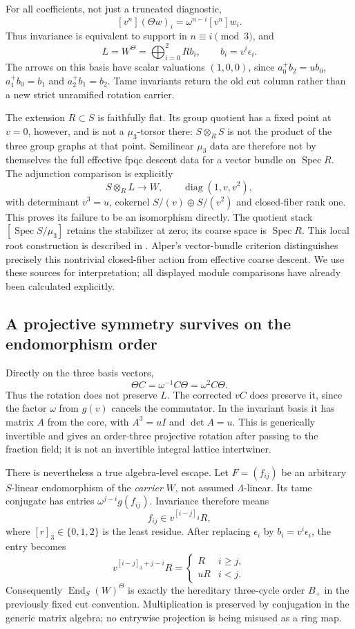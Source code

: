 \documentclass[11pt]{article}
\theoremstyle{definition}\newtheorem{definition}[theorem]{Definition}
\theoremstyle{remark}\newtheorem{remark}[theorem]{Remark}
\begin{document}
For all coefficients, not just a truncated diagnostic,
\[
 [v^n](\Theta w)_i=\omega^{n-i}[v^n]w_i.
\]
Thus invariance is equivalent to support in $n\equiv i\pmod3$, and
\[
 L=W^\Theta=\bigoplus_{i=0}^2 Rb_i,\qquad b_i=v^i\epsilon_i.
\]
The arrows on this basis have scalar valuations $(1,0,0)$, since $a_0^+b_2=ub_0$, $a_1^+b_0=b_1$ and $a_2^+b_1=b_2$. Tame invariants return the old cut column rather than a new strict unramified rotation carrier.

The extension $R\subset S$ is faithfully flat. Its group quotient has a fixed point at $v=0$, however, and is not a $\mu_3$-torsor there: $S\otimes_R S$ is not the product of the three group graphs at that point. Semilinear $\mu_3$ data are therefore not by themselves the full effective fpqc descent data for a vector bundle on $\operatorname{Spec}R$. The adjunction comparison is explicitly
\[
 S\otimes_R L\longrightarrow W,\qquad
 \operatorname{diag}(1,v,v^2),
\]
with determinant $v^3=u$, cokernel $S/(v)\oplus S/(v^2)$ and closed-fiber rank one. This proves its failure to be an isomorphism directly. The quotient stack $[\operatorname{Spec}S/\mu_3]$ retains the stabilizer at zero; its coarse space is $\operatorname{Spec}R$. This local root construction is described in \cite{RootStackGuide}. Alper's vector-bundle criterion \cite[Theorem10.3, pp.2386--2387]{AlperDescent} distinguishes precisely this nontrivial closed-fiber action from effective coarse descent. We use these sources for interpretation; all displayed module comparisons have already been calculated explicitly.

\subsection{A projective symmetry survives on the endomorphism order}
Directly on the three basis vectors,
\[
 \Theta C=\omega^{-1}C\Theta=\omega^2C\Theta.
\]
Thus the rotation does not preserve $L$. The corrected $vC$ does preserve it, since the factor $\omega$ from $g(v)$ cancels the commutator. In the invariant basis it has matrix $A$ from the core, with $A^3=uI$ and $\det A=u$. This is generically invertible and gives an order-three projective rotation after passing to the fraction field; it is not an invertible integral lattice intertwiner.

There is nevertheless a true algebra-level escape. Let $F=(f_{ij})$ be an arbitrary $S$-linear endomorphism of the \emph{carrier} $W$, not assumed $\Lambda$-linear. Its tame conjugate has entries $\omega^{j-i}g(f_{ij})$. Invariance therefore means
\[
 f_{ij}\in v^{[i-j]_3}R,
\]
where $[r]_3\in\{0,1,2\}$ is the least residue. After replacing $\epsilon_i$ by $b_i=v^i\epsilon_i$, the entry becomes
\[
 v^{[i-j]_3+j-i}R=
 \begin{cases}R&i\ge j,\\uR&i<j.\end{cases}
\]
Consequently $\operatorname{End}_S(W)^\Theta$ is exactly the hereditary three-cycle order $B_+$ in the previously fixed cut convention. Multiplication is preserved by conjugation in the generic matrix algebra; no entrywise projection is being misused as a ring map.
\end{document}
